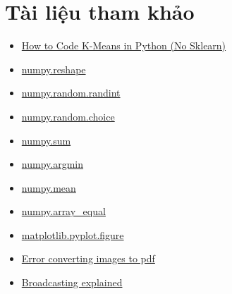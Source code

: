\documentclass{article}
\begin{document}
\section{Tài liệu tham khảo}
\begin{itemize}
    \item \href{https://youtu.be/uLs-EYUpGAw?t=231}{How to Code K-Means in Python (No Sklearn)}
    \item \href{https://numpy.org/doc/stable/reference/generated/numpy.reshape.html}{numpy.reshape}
    \item \href{https://numpy.org/doc/stable/reference/random/generated/numpy.random.randint.html}{numpy.random.randint}
    \item \href{https://numpy.org/doc/stable/reference/random/generated/numpy.random.choice.html}{numpy.random.choice}
    \item \href{https://numpy.org/doc/stable/reference/generated/numpy.sum.html}{numpy.sum}
    \item \href{https://numpy.org/doc/stable/reference/generated/numpy.argmin.html}{numpy.argmin}
    \item \href{https://numpy.org/doc/stable/reference/generated/numpy.mean.html}{numpy.mean}
    \item \href{https://numpy.org/doc/stable/reference/generated/numpy.array_equal.html}{numpy.array\_equal}
    \item \href{https://matplotlib.org/stable/api/_as_gen/matplotlib.pyplot.figure.html}{matplotlib.pyplot.figure}
    \item \href{https://www.reddit.com/r/learnpython/comments/4g4dru/error_converting_images_to_pdf/}{Error converting images to pdf}
    \item \href{https://numpy.org/doc/stable/user/basics.broadcasting.html}{Broadcasting explained}
\end{itemize}
\end{document}
